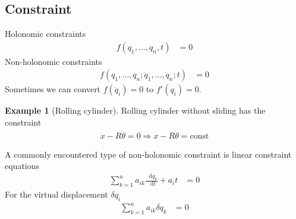\documentclass[twoside,9pt]{article}
\numberwithin{equation}{section} %
\newcommand{\lms}{\fontfamily{lmss}\selectfont} %
\renewcommand*\d{\mathop{}\!\mathrm{d}}
\theoremstyle{definition}
\newtheorem{example}{\lms Example}[section]
\theoremstyle{remark}
\begin{document}
\subsection{Constraint}
Holonomic constraints
\begin{align}
    f(q_1,\dots,q_n,t) &= 0
\end{align}
Non-holonomic constraints
\begin{align}
    f(q_1,\dots,q_n;\dot{q}_1,\dots,\dot{q}_n;t) &= 0
\end{align}
Sometimes we can convert $f(\dot{q}_i)=0$ to $f'(q_i)=0$.
\begin{example}[Rolling cylinder]
Rolling cylinder without sliding has the constraint
\begin{align}
    \dot{x} - R\dot{\theta} = 0
    \Rightarrow x-R\theta = \text{const}
\end{align}
\tikzexternalenable
\begin{figure}[H]
    \centering
\end{figure}
\tikzexternaldisable
\end{example}

A commonly encountered type of non-holonomic constraint is linear constraint equations
\begin{align}
    \sum_{k=1}^n a_{ik}\frac{\d q_k}{\d t} + a_i t &= 0
\end{align}
For the virtual displacement $\delta q_i$
\begin{align}
    \sum_{k=1}^n a_{ik}\delta q_k &= 0
\end{align}
\end{document}
